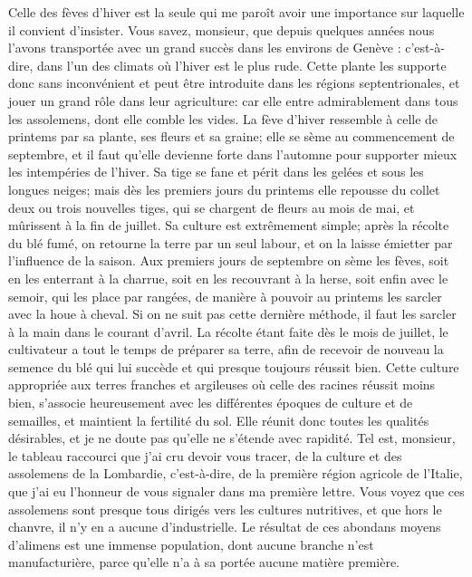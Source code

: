Celle des fèves d’hiver est la seule qui me paroît avoir une importance sur laquelle il convient d’insister.
Vous savez, monsieur, que depuis quelques années nous l’avons transportée avec un grand succès dans les environs de Genève : c’est-à-dire, dans l’un des climats où l’hiver est\setcounter{page}{441} le plus rude. Cette plante les supporte donc sans inconvénient et peut être introduite dans les régions septentrionales, et jouer un grand rôle dans leur agriculture: car elle entre admirablement dans tous les assolemens, dont elle comble les vides. La fève d'hiver ressemble à celle de printems par sa plante, ses fleurs et sa graine; elle se sème au commencement de septembre, et il faut qu'elle devienne forte dans l'automne pour supporter mieux les intempéries de l'hiver. Sa tige se fane et périt dans les gelées et sous les longues neiges; mais dès les premiers jours du printems elle repousse du collet deux ou trois nouvelles tiges, qui se chargent de fleurs au mois de mai, et mûrissent à la fin de juillet. Sa culture est extrêmement simple; après la récolte du blé fumé, on retourne la terre par un seul labour, et on la laisse émietter par l'influence de la saison. Aux premiers jours de septembre on sème les fèves, soit en les enterrant à la charrue, soit en les recouvrant à la herse, soit enfin avec le semoir, qui les place par rangées, de manière à pouvoir au printems les sarcler avec la houe à cheval. Si on ne suit pas cette dernière méthode, il faut les sarcler à la main dans le courant d'avril.
\setcounter{page}{442} La récolte étant faite dès le mois de juillet, le cultivateur a tout le temps de préparer sa terre, afin de recevoir de nouveau la semence du blé qui lui succède et qui presque toujours réussit bien.
Cette culture appropriée aux terres franches et argileuses où celle des racines réussit moins bien, s'associe heureusement avec les différentes époques de culture et de semailles, et maintient la fertilité du sol. Elle réunit donc toutes les qualités désirables, et je ne doute pas qu'elle ne s'étende avec rapidité.
Tel est, monsieur, le tableau raccourci que j'ai cru devoir vous tracer, de la culture et des assolemens de la Lombardie, c'est-à-dire, de la première région agricole de l'Italie, que j'ai eu l'honneur de vous signaler dans ma première lettre. Vous voyez que ces assolemens sont presque tous dirigés vers les cultures nutritives, et que hors le chanvre, il n'y en a aucune d'industrielle. Le résultat de ces abondans moyens d'alimens est une immense population, dont aucune branche n'est manufacturière, parce qu'elle n'a à sa portée aucune matière première.
